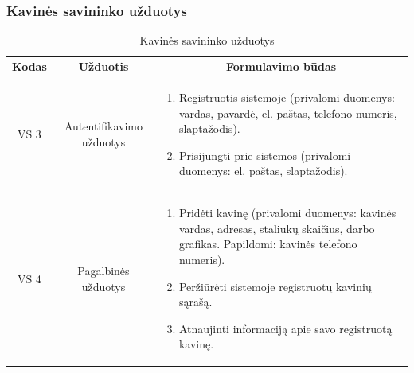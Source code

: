 \documentclass{VUMIFPSkursinis}
\begin{document}
\subsubsection{Kavinės savininko užduotys}
\begin{center}
	\begin{table}[H]
	\caption{Kavinės savininko užduotys}
	\begin{tabular}{|p{2cm}|p{}|p{}|}
	\hline
	    \rowcolor{lightgray}
		\multicolumn{3}{|c|}{Kavinės savininko užduotys}\\
		
	\hline
		\multicolumn{1}{|c|}{{\bfseries Kodas}}&
		\multicolumn{1}{|c|}{{\bfseries Užduotis}}&
		\multicolumn{1}{|c|}{{\bfseries Formulavimo būdas}}\\		
	\hline
		\multicolumn{1}{|c|}{VS 3}&  	
		\multicolumn{1}{|c|}{Autentifikavimo užduotys}&
		{
			\begin{enumerate}
				\item Registruotis sistemoje (privalomi duomenys: vardas, pavardė, el. paštas, telefono numeris, slaptažodis).
				\item Prisijungti prie sistemos (privalomi duomenys: el. paštas, slaptažodis).
			\end{enumerate}}\\
	\hline
		\multicolumn{1}{|c|}{VS 4}&
		\multicolumn{1}{|c|}{Pagalbinės užduotys}&
		{
			\begin{enumerate}
				\item Pridėti kavinę (privalomi duomenys: kavinės vardas, adresas, staliukų skaičius, darbo grafikas. Papildomi: kavinės telefono numeris).
				\item Peržiūrėti sistemoje registruotų kavinių sąrašą.
				\item Atnaujinti informaciją apie savo registruotą kavinę.
			\end{enumerate}}\\
	
	\hline 	 	
	\end{tabular}
	
	\label{table:2}
	\end{table}

\end{center}
\end{document}

